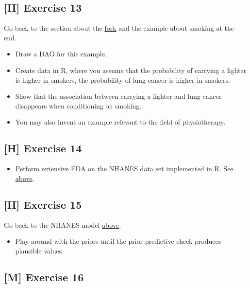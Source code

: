 \documentclass[
]{book}
\providecommand{\tightlist}{%
  \setlength{\itemsep}{0pt}\setlength{\parskip}{0pt}}
\begin{document}
\subsection{{[}H{]} Exercise 13}\label{exercise13_multiple_regression}

Go back to the section about the \hyperref[fork]{fork} and the example about smoking at the end.

\begin{itemize}
\tightlist
\item
  Draw a DAG for this example.
\item
  Create data in R, where you assume that the probability of carrying a lighter is higher in smokers,
  the probability of lung cancer is higher in smokers.
\item
  Show that the association between carrying a lighter and lung cancer disappears when conditioning on smoking.
\item
  You may also invent an example relevant to the field of physiotherapy.
\end{itemize}

\subsection{{[}H{]} Exercise 14}\label{exercise14_multiple_regression}

\begin{itemize}
\tightlist
\item
  Perform extensive EDA on the NHANES data set implemented in R.
  See \hyperref[example_nhanes]{above}.
\end{itemize}

\subsection{{[}H{]} Exercise 15}\label{exercise15_multiple_regression}

Go back to the NHANES model \hyperref[prior_predictive_checks_NHANES]{above}.

\begin{itemize}
\tightlist
\item
  Play around with the priors until the prior predictive check produces plausible values.
\end{itemize}

\subsection{{[}M{]} Exercise 16}\label{exercise16_multiple_regression}
\end{document}
